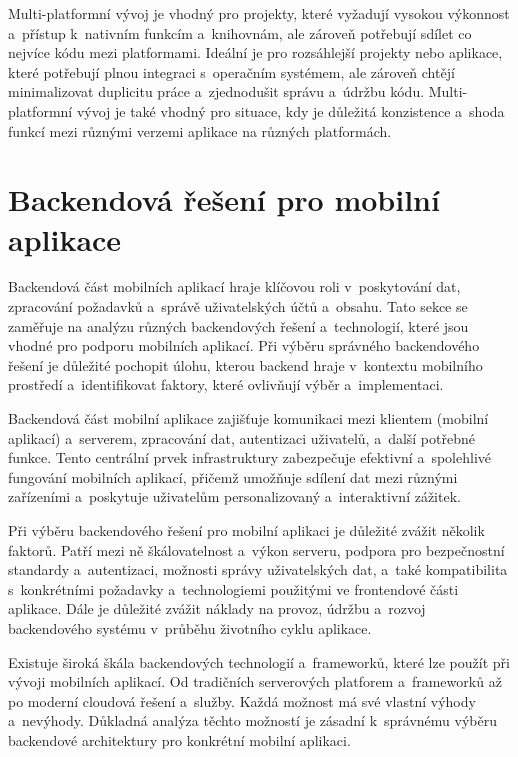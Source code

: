 Multi-platformní vývoj je vhodný pro projekty, které vyžadují vysokou výkonnost a~přístup k~nativním funkcím a~knihovnám, ale zároveň potřebují sdílet co nejvíce kódu mezi platformami. Ideální je pro rozsáhlejší projekty nebo aplikace, které potřebují plnou integraci s~operačním systémem, ale zároveň chtějí minimalizovat duplicitu práce a~zjednodušit správu a~údržbu kódu. Multi-platformní vývoj je také vhodný pro situace, kdy je důležitá konzistence a~shoda funkcí mezi různými verzemi aplikace na různých platformách.

\section{Backendová řešení pro mobilní aplikace}\label{backend}

Backendová část mobilních aplikací hraje klíčovou roli v~poskytování dat, zpracování požadavků a~správě uživatelských účtů a~obsahu. Tato sekce se zaměřuje na analýzu různých backendových řešení a~technologií, které jsou vhodné pro podporu mobilních aplikací. Při výběru správného backendového řešení je důležité pochopit úlohu, kterou backend hraje v~kontextu mobilního prostředí a~identifikovat faktory, které ovlivňují výběr a~implementaci.

Backendová část mobilní aplikace zajišťuje komunikaci mezi klientem (mobilní aplikací) a~serverem, zpracování dat, autentizaci uživatelů, a~další potřebné funkce. Tento centrální prvek infrastruktury zabezpečuje efektivní a~spolehlivé fungování mobilních aplikací, přičemž umožňuje sdílení dat mezi různými zařízeními a~poskytuje uživatelům personalizovaný a~interaktivní zážitek.

Při výběru backendového řešení pro mobilní aplikaci je důležité zvážit několik faktorů. Patří mezi ně škálovatelnost a~výkon serveru, podpora pro bezpečnostní standardy a~autentizaci, možnosti správy uživatelských dat, a~také kompatibilita s~konkrétními požadavky a~technologiemi použitými ve frontendové části aplikace. Dále je důležité zvážit náklady na provoz, údržbu a~rozvoj backendového systému v~průběhu životního cyklu aplikace.

Existuje široká škála backendových technologií a~frameworků, které lze použít při vývoji mobilních aplikací. Od tradičních serverových platforem a~frameworků až po moderní cloudová řešení a~služby. Každá možnost má své vlastní výhody a~nevýhody. Důkladná analýza těchto možností je zásadní k~správnému výběru backendové architektury pro konkrétní mobilní aplikaci.

